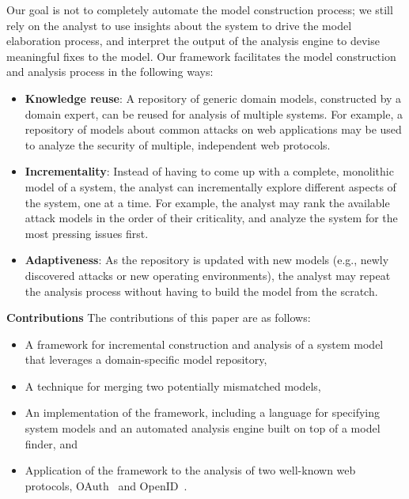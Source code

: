 Our goal is not to completely automate the model construction process;
we still rely on the analyst to use insights about the system to drive
the model elaboration process, and interpret the output of the
analysis engine to devise meaningful fixes to the model. Our framework
facilitates the model construction and analysis process in the
following ways:
\begin{itemize}
\item \textbf{Knowledge reuse}: A repository of generic domain models,
  constructed by a domain expert, can be reused for analysis of
  multiple systems. For example, a repository of models about common
  attacks on web applications may be used to analyze the security of
  multiple, independent web protocols.
\item \textbf{Incrementality}: Instead of having to come up with a
  complete, monolithic model of a system, the analyst can
  incrementally explore different aspects of the system, one at a
  time. For example, the analyst may rank the available attack models
  in the order of their criticality, and analyze the system for the
  most pressing issues first.
\item \textbf{Adaptiveness}: As the repository is updated with new
  models (e.g., newly discovered attacks or new operating environments),
  the analyst may repeat the analysis process without having to build
  the model from the scratch.
\end{itemize}

\textbf{Contributions} The contributions of this paper are as
follows:
\begin{itemize}
\item A framework for incremental construction and analysis of a
  system model that leverages a domain-specific model repository,
\item A technique for merging two potentially mismatched models,
\item An implementation of the framework, including a language for
  specifying system models and an automated analysis engine built on
  top of a model finder, and
\item Application of the framework to the analysis of two well-known
  web protocols, OAuth~\cite{oauth} and OpenID~\cite{openid}.
\end{itemize}

